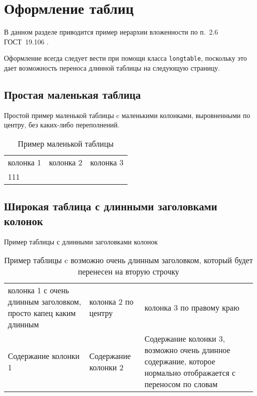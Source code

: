 \section{Оформление таблиц}

В данном разделе приводится пример иерархии вложенности по п.~2.6 ГОСТ~19.106 \cite{gost19106}.

Оформление всегда следует вести при помощи класса \lstinline|longtable|, поскольку это дает возможность переноса длинной таблицы на следующую страницу.

\subsection{Простая маленькая таблица}

Простой пример маленькой таблицы c маленькими колонками, выровненными по центру, без каких-либо переполнений.

\begin{longtable}[c]{| >{\centering}m{25mm} | >{\centering}m{25mm} | >{\centering}m{50mm} |}
	\caption{Пример маленькой таблицы\hspace{25cm}} %
	\label{t:tab0} \\		
	\hline %
	колонка 1 & колонка 2 & колонка 3 \tabularnewline
	\hhline{|=|=|=|} %
	111 & 222 & 333
	\tabularnewline\hline %
\end{longtable}

\subsection{Широкая таблица с длинными заголовками колонок}

Пример таблицы с длинными заголовками колонок

\begin{longtable}[c]{| >{\raggedright}m{55mm} | >{\centering}m{55mm} | >{\raggedleft}m{55mm} |}
	\caption{Пример таблицы c возможно очень длинным заголовком, который будет перенесен на вторую строчку\hspace{25cm}} %
	\label{t:tab1} \\		
	\hline %
	колонка 1 с очень длинным заголовком, просто капец каким длинным & колонка 2 по центру & колонка 3 по правому краю \tabularnewline
	\hhline{|=|=|=|} %
	Содержание колонки 1 & Содержание колонки 2 & Содержание колонки 3, возможно очень длинное содержание, которое нормально отображается с переносом по словам
	\tabularnewline\hline %
\end{longtable}

